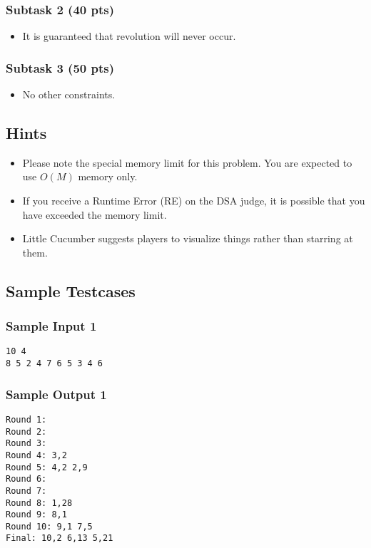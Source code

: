 \subsubsection{Subtask 2 (40 pts)}\label{subtask-1-20}

\begin{itemize}
\tightlist
\item It is guaranteed that revolution will never occur. 
\end{itemize}

\subsubsection{Subtask 3 (50 pts)}\label{subtask-1-20}

\begin{itemize}
\tightlist
\item No other constraints.
\end{itemize}

\subsection{Hints}
\begin{itemize}
    \item Please note the special memory limit for this problem. You are expected to use $O(M)$ memory only.
    \item If you receive a Runtime Error (RE) on the DSA judge, it is possible that you have exceeded the memory limit.
    \item Little Cucumber suggests players to visualize things rather than starring at them.
\end{itemize}

\newpage

\subsection{Sample Testcases}

\subsubsection{Sample Input 1}\label{sample-input-1}
\begin{verbatim}
10 4
8 5 2 4 7 6 5 3 4 6
\end{verbatim}

\subsubsection{Sample Output 1}\label{sample-output-1}
\begin{verbatim}
Round 1:
Round 2:
Round 3:
Round 4: 3,2
Round 5: 4,2 2,9
Round 6:
Round 7:
Round 8: 1,28
Round 9: 8,1
Round 10: 9,1 7,5
Final: 10,2 6,13 5,21
\end{verbatim}

